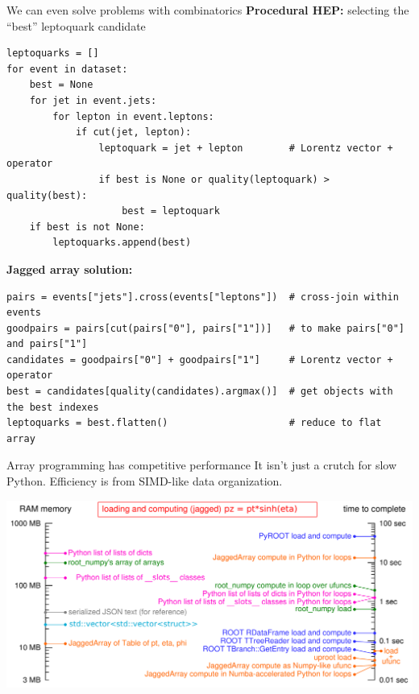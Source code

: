 \documentclass[aspectratio=169]{beamer}
\begin{document}
\begin{frame}[fragile]{We can even solve problems with combinatorics}
\vspace{0.35 cm}
{\normalsize\bf Procedural HEP:} selecting the ``best'' leptoquark candidate

\scriptsize
\begin{verbatim}
leptoquarks = []
for event in dataset:
    best = None
    for jet in event.jets:
        for lepton in event.leptons:
            if cut(jet, lepton):
                leptoquark = jet + lepton        # Lorentz vector + operator
                if best is None or quality(leptoquark) > quality(best):
                    best = leptoquark
    if best is not None:
        leptoquarks.append(best)
\end{verbatim}

\vspace{0.5 cm}
{\normalsize\bf Jagged array solution:}

\scriptsize
\begin{verbatim}
pairs = events["jets"].cross(events["leptons"])  # cross-join within events
goodpairs = pairs[cut(pairs["0"], pairs["1"])]   # to make pairs["0"] and pairs["1"]
candidates = goodpairs["0"] + goodpairs["1"]     # Lorentz vector + operator
best = candidates[quality(candidates).argmax()]  # get objects with the best indexes
leptoquarks = best.flatten()                     # reduce to flat array
\end{verbatim}
\end{frame}

\begin{frame}{Array programming has competitive performance}
\vspace{0.25 cm}
It isn't just a crutch for slow Python. Efficiency is from SIMD-like data organization.

\vspace{0.4 cm}
\includegraphics[width=\linewidth]{logscales.pdf}
\end{frame}
\end{document}
